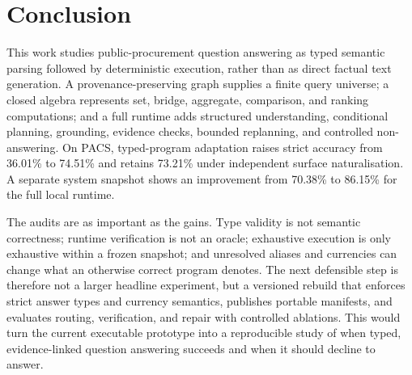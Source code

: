\section{Conclusion}

This work studies public-procurement question answering as typed semantic parsing followed by
deterministic execution, rather than as direct factual text generation.  A provenance-preserving
graph supplies a finite query universe; a closed algebra represents set, bridge, aggregate,
comparison, and ranking computations; and a full runtime adds structured understanding,
conditional planning, grounding, evidence checks, bounded replanning, and controlled
non-answering.  On PACS, typed-program adaptation raises strict accuracy from 36.01\% to 74.51\%
and retains 73.21\% under independent surface naturalisation.  A separate system snapshot shows
an improvement from 70.38\% to 86.15\% for the full local runtime.

The audits are as important as the gains.  Type validity is not semantic correctness; runtime
verification is not an oracle; exhaustive execution is only exhaustive within a frozen snapshot;
and unresolved aliases and currencies can change what an otherwise correct program denotes.
The next defensible step is therefore not a larger headline experiment, but a versioned rebuild
that enforces strict answer types and currency semantics, publishes portable manifests, and
evaluates routing, verification, and repair with controlled ablations.  This would turn the
current executable prototype into a reproducible study of when typed, evidence-linked question
answering succeeds and when it should decline to answer.
